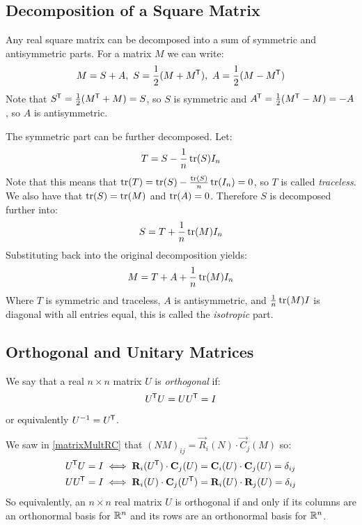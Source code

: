 \documentclass[../main.tex]{subfiles}
\begin{document}
\subsection{Decomposition of a Square Matrix}
\label{matrixDecomp}
Any real square matrix can be decomposed into a sum of symmetric and antisymmetric parts.
For a matrix $M$ we can write:
\[
  M  = S + A,\ S = \frac{1}{2}(M + M^{{\mkern-1.5mu\mathsf{T}}}),\ A = \frac{1}{2}(M - M^{{\mkern-1.5mu\mathsf{T}}})
\]
Note that $S^{{\mkern-1.5mu\mathsf{T}}} = \frac{1}{2}(M^{{\mkern-1.5mu\mathsf{T}}} + M) = S$, so $S$ is symmetric and $A^{{\mkern-1.5mu\mathsf{T}}} = \frac{1}{2}(M^{{\mkern-1.5mu\mathsf{T}}} - M) = -A$, so $A$ is antisymmetric.

The symmetric part can be further decomposed.
Let:
\[
  T = S - \frac{1}{n}\operatorname{tr}(S)I_n
\]
Note that this means that $\operatorname{tr}(T) = \operatorname{tr}(S) - \frac{\operatorname{tr}(S)}{n}\operatorname{tr}(I_n) = 0$, so $T$ is called \textit{traceless}.
We also have that $\operatorname{tr}(S) = \operatorname{tr}(M)$ and $\operatorname{tr}(A) = 0$.
Therefore $S$ is decomposed further into:
\[
  S = T + \frac{1}{n}\operatorname{tr}(M)I_n
\]
Substituting back into the original decomposition yields:
\[
  M = T + A + \frac{1}{n}\operatorname{tr}(M)I_n
\]
Where $T$ is symmetric and traceless, $A$ is antisymmetric, and $\frac{1}{n}\operatorname{tr}(M)I$ is diagonal with all entries equal, this is called the \textit{isotropic} part.
\subsection{Orthogonal and Unitary Matrices}
\label{orthogonalMatrices}
\begin{definition}
  We say that a real $n \times n$ matrix $U$ is \textit{orthogonal} if:
  \[
    U^{{\mkern-1.5mu\mathsf{T}}}U = UU^{{\mkern-1.5mu\mathsf{T}}} = I
  \]
  or equivalently $U^{-1} = U^{{\mkern-1.5mu\mathsf{T}}}$.
\end{definition}
We saw in \cref{matrixMultRC} that $(NM)_{i j} = \vec{R}_i(N) \cdot \vec{C}_j(M)$ so:
\begin{align*}
  U^{{\mkern-1.5mu\mathsf{T}}}U &= I \iff \mathbf{\bm{R}}_i(U^{{\mkern-1.5mu\mathsf{T}}}) \cdot \mathbf{\bm{C}}_j(U) = \mathbf{\bm{C}}_i(U) \cdot \mathbf{\bm{C}}_j(U) = \delta_{i j} \\
  UU^{{\mkern-1.5mu\mathsf{T}}} &= I \iff \mathbf{\bm{R}}_i(U) \cdot \mathbf{\bm{C}}_j(U^{{\mkern-1.5mu\mathsf{T}}}) = \mathbf{\bm{R}}_i(U) \cdot \mathbf{\bm{R}}_j(U) = \delta_{i j}
\end{align*}
So equivalently, an $n \times n$ real matrix $U$ is orthogonal if and only if its columns are an orthonormal basis for $\mathbb{R}^{n}$ and its rows are an orthonormal basis for $\mathbb{R}^{n}$.
\end{document}
